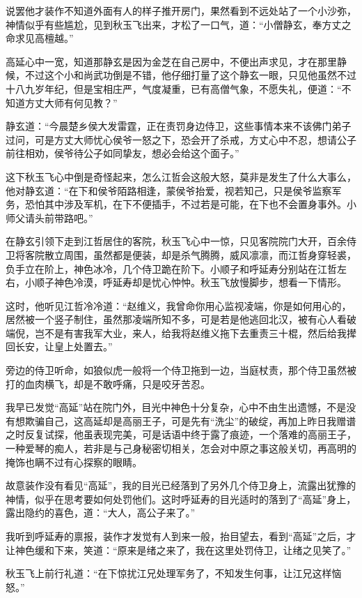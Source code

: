 说罢他才装作不知道外面有人的样子推开房门，果然看到不远处站了一个小沙弥，神情似乎有些尴尬，见到秋玉飞出来，才松了一口气，道：“小僧静玄，奉方丈之命求见高檀越。”

高延心中一宽，知道那静玄是因为金芝在自己房中，不便出声求见，才在那里静候，不过这个小和尚武功倒是不错，他仔细打量了这个静玄一眼，只见他虽然不过十八九岁年纪，但是宝相庄严，气度凝重，已有高僧气象，不愿失礼，便道：“不知道方丈大师有何见教？”

静玄道：“今晨楚乡侯大发雷霆，正在责罚身边侍卫，这些事情本来不该佛门弟子过问，可是方丈大师忧心侯爷一怒之下，恐会开了杀戒，方丈心中不忍，想请公子前往相劝，侯爷待公子如同挚友，想必会给这个面子。”

这下秋玉飞心中倒是奇怪起来，怎么江哲会这般大怒，莫非是发生了什么大事么，他对静玄道：“在下和侯爷陌路相逢，蒙侯爷抬爱，视若知己，只是侯爷监察军务，恐怕其中涉及军机，在下不便插手，不过若是可能，在下也不会置身事外。小师父请头前带路吧。”

在静玄引领下走到江哲居住的客院，秋玉飞心中一惊，只见客院院门大开，百余侍卫将客院散立周围，虽然都是便装，却是杀气腾腾，威风凛凛，而江哲身穿轻裘，负手立在阶上，神色冰冷，几个侍卫跪在阶下。小顺子和呼延寿分别站在江哲左右，小顺子神色冷漠，呼延寿却是忧心忡忡。秋玉飞放慢脚步，想看一下情形。

这时，他听见江哲冷冷道：“赵维义，我曾命你用心监视凌端，你是如何用心的，居然被一个竖子制住，虽然那凌端所知不多，可是若是他逃回北汉，被有心人看破端倪，岂不是有害我军大业，来人，给我将赵维义拖下去重责三十棍，然后给我撵回长安，让皇上处置去。”

旁边的侍卫听命，如狼似虎一般将一个侍卫拖到一边，当庭杖责，那个侍卫虽然被打的血肉横飞，却是不敢呼痛，只是咬牙苦忍。

我早已发觉“高延”站在院门外，目光中神色十分复杂，心中不由生出遗憾，不是没有想欺骗自己，这高延却是高丽王子，可是先有“洗尘”的破绽，再加上昨日我赠谱之时反复试探，他虽表现完美，可是话语中终于露了痕迹，一个落难的高丽王子，一种爱琴的痴人，若非是与己身秘密切相关，怎会对中原之事这般关切，再高明的掩饰也瞒不过有心探察的眼睛。

故意装作没有看见“高延”，我的目光已经落到了另外几个侍卫身上，流露出犹豫的神情，似乎在思考要如何处罚他们。这时呼延寿的目光适时的落到了“高延”身上，露出隐约的喜色，道：“大人，高公子来了。”

我听到呼延寿的禀报，装作才发觉有人到来一般，抬目望去，看到“高延”之后，才让神色缓和下来，笑道：“原来是绪之来了，我在这里处罚侍卫，让绪之见笑了。”

秋玉飞上前行礼道：“在下惊扰江兄处理军务了，不知发生何事，让江兄这样恼怒。”

